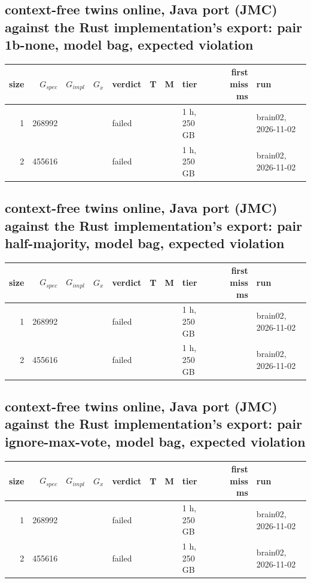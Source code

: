 \documentclass[10pt]{article}
\begin{document}
\subsection*{context-free twins online, Java port (JMC) against the Rust implementation's export: pair \textsf{1b-none}, model bag, expected violation}
\begin{longtable}{@{}rrrrlrrlrl@{}}
\toprule
size & $G_{\mathit{spec}}$ & $G_{\mathit{impl}}$ & $G_x$ & verdict & T & M & tier & first miss ms & run \\
\midrule
\endhead
\color{blue} 1 & 268992 &  &  & failed &  &  & 1 h, 250 GB &  & brain02, 2026-11-02 \\
\color{blue} 2 & 455616 &  &  & failed &  &  & 1 h, 250 GB &  & brain02, 2026-11-02 \\
\bottomrule
\end{longtable}
\subsection*{context-free twins online, Java port (JMC) against the Rust implementation's export: pair \textsf{half-majority}, model bag, expected violation}
\begin{longtable}{@{}rrrrlrrlrl@{}}
\toprule
size & $G_{\mathit{spec}}$ & $G_{\mathit{impl}}$ & $G_x$ & verdict & T & M & tier & first miss ms & run \\
\midrule
\endhead
\color{blue} 1 & 268992 &  &  & failed &  &  & 1 h, 250 GB &  & brain02, 2026-11-02 \\
\color{blue} 2 & 455616 &  &  & failed &  &  & 1 h, 250 GB &  & brain02, 2026-11-02 \\
\bottomrule
\end{longtable}
\subsection*{context-free twins online, Java port (JMC) against the Rust implementation's export: pair \textsf{ignore-max-vote}, model bag, expected violation}
\begin{longtable}{@{}rrrrlrrlrl@{}}
\toprule
size & $G_{\mathit{spec}}$ & $G_{\mathit{impl}}$ & $G_x$ & verdict & T & M & tier & first miss ms & run \\
\midrule
\endhead
\color{blue} 1 & 268992 &  &  & failed &  &  & 1 h, 250 GB &  & brain02, 2026-11-02 \\
\color{blue} 2 & 455616 &  &  & failed &  &  & 1 h, 250 GB &  & brain02, 2026-11-02 \\
\bottomrule
\end{longtable}
\end{document}

